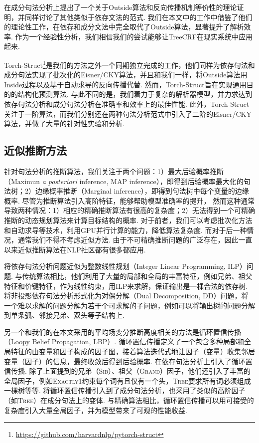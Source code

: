 \citet{eisner-2016-inside}在成分句法分析上提出了一个关于Outside算法和反向传播机制等价性的理论证明，并同样讨论了其他类似于依存文法的范式.
我们在本文中的工作中借鉴了他们的理论性工作，在依存和成分文法中完全取代了Outside算法，显著提升了解析效率.
作为一个经验性分析，我们相信我们的尝试能够让TreeCRF在现实系统中应用起来.

Torch-Struct\footnote{\url{https://github.com/harvardnlp/pytorch-struct}}\citep{rush-2020-torch}是我们的方法之外一个同期独立完成的工作，他们同样为依存句法和成分句法实现了批次化的Eisner/CKY算法，并且和我们一样，将Outside算法用Inside过程以及基于自动求导的反向传播代替.
然而，Torch-Struct旨在实现通用目的的结构化预测算法.
与此不同的是，我们着力于复杂的解析器模型，并力求达到依存句法分析和成分句法分析在准确率和效率上的最佳性能.
此外，Torch-Struct关注于一阶算法，而我们分别还在两种句法分析范式中引入了二阶的Eisner/CKY算法，并做了大量的针对性实验和分析.

\subsection{近似推断方法}
针对句法分析的推断算法，我们关注于两个问题：1）最大后验概率推断（Maximun \textit{a posteriori} inference, MAP inference），即得到后验概率最大化的句法树；2）边缘概率推断（Marginal inference），即得到句法树中每个变量的边缘概率.
尽管为推断算法引入高阶特征，能够帮助模型准确率的提升\citep{mcdonald-pereira-2006-online,carreras-2007-experiments,koo-collins-2010-efficient,ma-zhao-2012-fourth}，
然而这种通常导致两种情况：1）相应的精确推断算法有很高的复杂度；2）无法得到一个可精确推断的动态规划算法来计算目标结构的概率.
对于前者，我们可以考虑批次化方法和自动求导等技术，利用GPU并行计算的能力，降低算法复杂度.
而对于后一种情况，通常我们不得不考虑近似方法.
由于不可精确推断问题的广泛存在，因此一直以来近似推断算法在NLP社区都有很多都应用.

\citet{martins-etal-2009-concise}将依存句法分析问题近似为整数线性规划（Integer Linear Programming, ILP）问题.
与传统算法相比，他们利用了大量的局部和全局的丰富特征，例如兄弟、祖父特征和价键特征，作为线性约束，用ILP来求解，保证输出是一棵合法的依存树.
\citet{koo-etal-2010-dual}将非投影依存句法分析形式化为对偶分解（Dual Decomposition, DD）问题，将一个难以求解的问题分解为若干个可求解的子问题，例如可以将输出树的问题分解到单条弧、邻接兄弟、双头等子结构上\citep{martins-etal-2011-dual}.

另一个和我们的在本文采用的平均场变分推断高度相关的方法是循环置信传播（Loopy Belief Propagation, LBP）.
循环置信传播定义了一个包含多种局部和全局特征的由变量和因子构成的因子图，接着算法迭代式地让因子（变量）收集邻居变量（因子）的信息，最终收敛后得到后验概率.
\cite{smith-eisner-2008-dependency,gormley-etal-2015-approximation}在依存句法分析上引入了循环置信传播.
除了上面提到的兄弟（\textsc{Sib}）、祖父（\textsc{Grand}）因子，他们还引入了丰富的全局因子，例如\textsc{Exactly1}约束每个词有且仅有一个头，\textsc{Tree}要求所有词必须组成一棵树等等.
\citet{naradowsky-etal-2012-grammarless}将循环置信传播引入到了成分句法分析，也采用了类似的高阶因子（如\textsc{Tree}）在成分句法上的变体.
与精确算法相比，循环置信传播可以用可接受的复杂度引入大量全局因子，并为模型带来了可观的性能收益.

